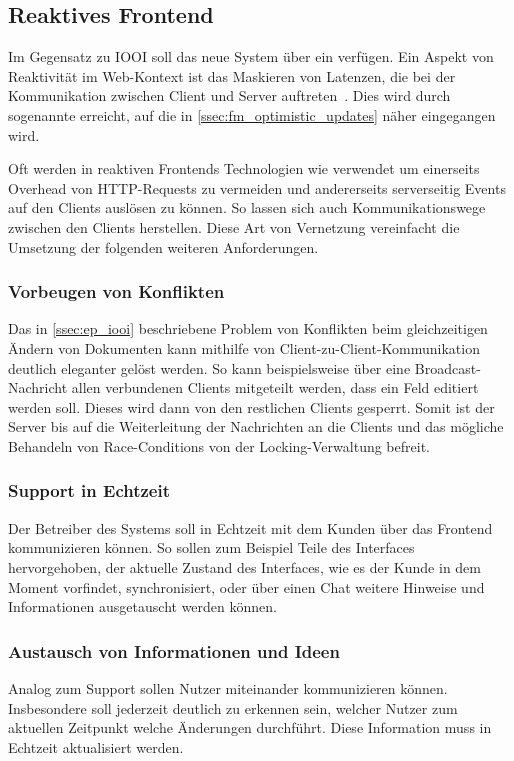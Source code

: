 \subsection{Reaktives Frontend}
\label{ssec:ea_reaktives_frontend}

Im Gegensatz zu IOOI soll das neue System über ein  verfügen.  Ein Aspekt von Reaktivität im Web-Kontext ist das
Maskieren von Latenzen, die bei der Kommunikation zwischen Client und Server
auftreten~\cite{reactive-frontends}.  Dies wird durch sogenannte
 erreicht, auf die in
\cref{ssec:fm_optimistic_updates} näher eingegangen wird.

Oft werden in reaktiven Frontends Technologien wie 
\cite{RFC6455} verwendet um einerseits Overhead von HTTP-Requests zu vermeiden
und andererseits serverseitig Events auf den Clients auslösen zu können.  So
lassen sich auch Kommunikationswege zwischen den Clients herstellen.  Diese Art
von Vernetzung vereinfacht die Umsetzung der folgenden weiteren Anforderungen.

\subsubsection{Vorbeugen von Konflikten}
\label{sssec:ear_vorbeugen_von_konflikten}

Das in \cref{ssec:ep_iooi} beschriebene Problem von Konflikten beim
gleichzeitigen Ändern von Dokumenten kann mithilfe von
Client-zu-Client-Kommunikation deutlich eleganter gelöst werden.  So kann
beispielsweise über eine Broadcast-Nachricht allen verbundenen Clients
mitgeteilt werden, dass ein Feld editiert werden soll.  Dieses wird dann von
den restlichen Clients gesperrt.  Somit ist der Server bis auf die
Weiterleitung der Nachrichten an die Clients und das mögliche Behandeln von
Race-Conditions von der Locking-Verwaltung befreit.

\subsubsection{Support in Echtzeit}
\label{sssec:ear_support_in_echtzeit}

Der Betreiber des Systems soll in Echtzeit mit dem Kunden über das Frontend
kommunizieren können.  So sollen zum Beispiel Teile des Interfaces
hervorgehoben, der aktuelle Zustand des Interfaces, wie es der Kunde in dem
Moment vorfindet, synchronisiert, oder über einen Chat weitere Hinweise und
Informationen ausgetauscht werden können.

\subsubsection{Austausch von Informationen und Ideen}
\label{sssec:ear_austausch_von_informationen_und_ideen}

Analog zum Support sollen Nutzer miteinander kommunizieren können.  Insbesondere
soll jederzeit deutlich zu erkennen sein, welcher Nutzer zum aktuellen Zeitpunkt
welche Änderungen durchführt.  Diese Information muss in Echtzeit aktualisiert
werden.
